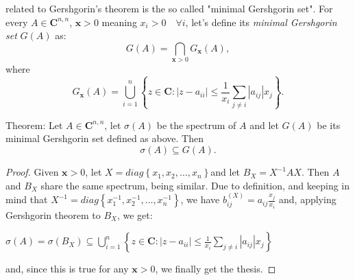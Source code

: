 \documentclass[12pt]{article}
\begin{document}
 related to Gershgorin's theorem is the so called "minimal Gershgorin set".
For every $A\in\mathbf{C}^{n,n}$, $\mathbf{x}>0$ meaning $x_i>0\quad \forall i$, let's define its \emph{minimal Gershgorin set} $G(A)$ as:
\[
G(A)=\bigcap_{\mathbf{x}>0} G_{\mathbf{x}}(A),
\]
where
\[
G_{\mathbf{x}}(A)=\bigcup_{i=1}^n \left\{z\in\mathbf{C}:\left|z-a_{ii}\right|\leq\frac{1}{x_i}\sum_{j\ne i}\left|a_{ij}\right|x_j\right\}.
\]

Theorem: Let $A\in\mathbf{C}^{n,n}$, let $\sigma(A)$ be the spectrum of $A$ and let $G(A)$ be its minimal Gershgorin set defined as above. Then
\[
\sigma(A)\subseteq G(A).
\]

\begin{proof}

Given $\mathbf{x}>0$, let $X=diag\left\{x_1, x_2, \ldots, x_n\right\}$and let $B_X=X^{-1}AX$. Then $A$ and $B_X$ share the same spectrum, being similar. Due to definition, and keeping in mind that $X^{-1}=diag\left\{x_1^{-1}, x_2^{-1}, \ldots, x_n^{-1}\right\}$, we have $b_{ij}^{(X)}=a_{ij}\frac{x_j}{x_i}$
and, applying Gershgorin theorem to $B_X$, we get:

$\sigma(A)=\sigma(B_X)\subseteq\bigcup_{i=1}^n \left\{z\in\mathbf{C}:\left|z-a_{ii}\right|\leq\frac{1}{x_i}\sum_{j\ne i}\left|a_{ij}\right|x_j\right\}$

and, since this is true for any $\mathbf{x}>0$, we finally get the thesis.
\end{proof}
\end{document}
